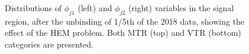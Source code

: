 \begin{figure}[htbp]
{    }
  \caption{Distributions of $\phi_{j1}$ (left) and $\phi_{j2}$ (right) variables in the signal region, after the unbinding of 1/5th of the 2018 data, showing the effect of the HEM problem. Both MTR (top) and VTR (bottom) categories are presented.}
  \label{fig:jet_phi_preHEM}
\end{figure}


